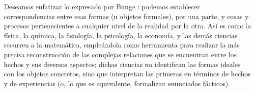 \begin{itemize}
    Deseamos enfatizar lo expresado por Bunge \cite{Bunge1960}: podemos establecer correspondencias entre esas formas (u objetos formales), por una parte, y cosas y procesos pertenecientes a cualquier nivel de la realidad por la otra. Así es como la física, la química, la fisiología, la psicología, la economía, y las demás ciencias recurren a la matemática, empleándola como herramienta para realizar la más precisa reconstrucción de las complejas relaciones que se encuentran entre los hechos y sus diversos aspectos; dichas ciencias no identifican las formas ideales con los objetos concretos, sino que interpretan las primeras en términos de hechos y de experiencias (o, lo que es equivalente, formalizan enunciados fácticos).
     
     \end{itemize}